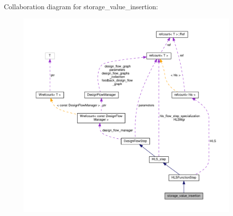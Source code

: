 Collaboration diagram for storage\+\_\+value\+\_\+insertion\+:
\nopagebreak
\begin{figure}[H]
\begin{center}
\leavevmode
\includegraphics[width=350pt]{d6/d1d/classstorage__value__insertion__coll__graph}
\end{center}
\end{figure}
